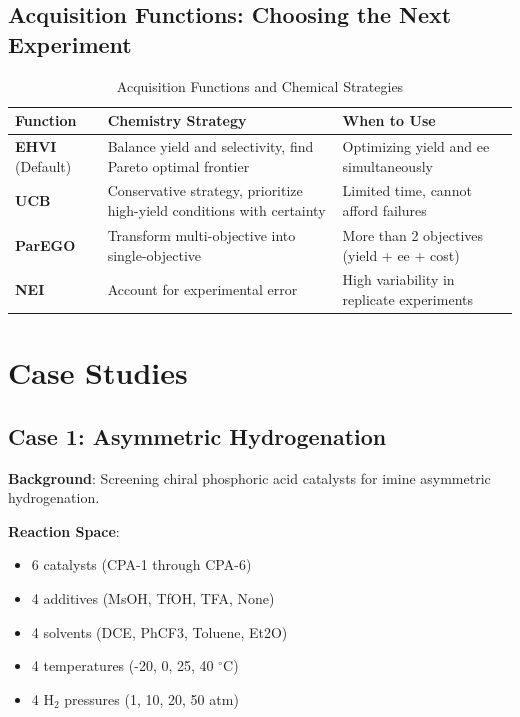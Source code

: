 \documentclass[12pt,a4paper]{article}
\begin{document}
\subsection{Acquisition Functions: Choosing the Next Experiment}

\begin{table}[h]
\centering
\caption{Acquisition Functions and Chemical Strategies}
\begin{tabular}{p{2.5cm}p{5.5cm}p{4.5cm}}
\toprule
\textbf{Function} & \textbf{Chemistry Strategy} & \textbf{When to Use} \\
\midrule
\textbf{EHVI} (Default) & Balance yield and selectivity, find Pareto optimal frontier & Optimizing yield and ee simultaneously \\
\textbf{UCB} & Conservative strategy, prioritize high-yield conditions with certainty & Limited time, cannot afford failures \\
\textbf{ParEGO} & Transform multi-objective into single-objective & More than 2 objectives (yield + ee + cost) \\
\textbf{NEI} & Account for experimental error & High variability in replicate experiments \\
\bottomrule
\end{tabular}
\end{table}

\section{Case Studies}
\label{sec:case_studies}

\subsection{Case 1: Asymmetric Hydrogenation}

\textbf{Background}: Screening chiral phosphoric acid catalysts for imine asymmetric hydrogenation.

\textbf{Reaction Space}:
\begin{itemize}
    \item 6 catalysts (CPA-1 through CPA-6)
    \item 4 additives (MsOH, TfOH, TFA, None)
    \item 4 solvents (DCE, PhCF3, Toluene, Et2O)
    \item 4 temperatures (-20, 0, 25, 40 $^\circ$C)
    \item 4 H$_2$ pressures (1, 10, 20, 50 atm)
\end{itemize}
\end{document}
